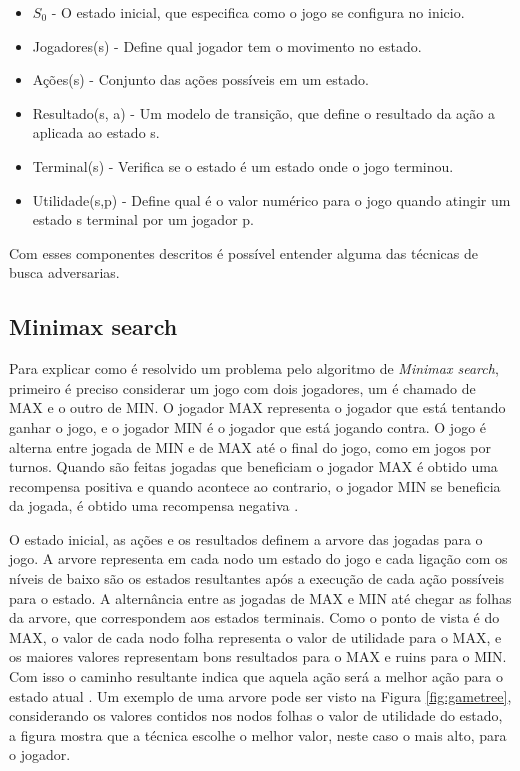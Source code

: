 \begin{itemize}
	\item $S_{0}$ - O estado inicial, que especifica como o jogo se configura no inicio.
	\item Jogadores(s) -  Define qual jogador tem o movimento no estado.
	\item Ações(s) - Conjunto das ações possíveis em um estado.
	\item Resultado(s, a) - Um modelo de transição, que define o resultado da ação a aplicada ao estado s.
	\item Terminal(s) - Verifica se o estado é um estado onde o jogo terminou.
	\item Utilidade(s,p) - Define qual é o valor numérico para o jogo quando atingir um estado s terminal por um jogador p. 
\end{itemize}

Com esses componentes descritos é possível entender alguma das técnicas de busca adversarias. 

\subsection{Minimax search}

Para explicar como é resolvido um problema pelo algoritmo de \textit{Minimax search}, primeiro é preciso considerar um jogo com dois jogadores, um é chamado de MAX e o outro de MIN. O jogador MAX representa o jogador que está tentando ganhar o jogo, e o jogador MIN é o jogador que está jogando contra. O jogo é alterna entre jogada de MIN e de MAX até o final do jogo, como em jogos por turnos. Quando são feitas jogadas que beneficiam o jogador MAX é obtido uma recompensa positiva e quando acontece ao contrario, o jogador MIN se beneficia da jogada, é obtido uma recompensa negativa \cite{intelligence2003modern}.
 
O estado inicial, as ações e os resultados definem a arvore das jogadas para o jogo. A arvore representa em cada nodo um estado do jogo e cada ligação com os níveis de baixo são os estados resultantes após a execução de cada ação possíveis para o estado. A alternância entre as jogadas de MAX e MIN até chegar as folhas da arvore, que correspondem aos estados terminais. Como o ponto de vista é do MAX, o valor de cada nodo folha representa o valor de utilidade para o MAX, e os maiores valores representam bons resultados para o MAX e ruins para o MIN. Com isso o caminho resultante indica que aquela ação será a melhor ação para o estado atual \cite{intelligence2003modern}. Um exemplo de uma arvore pode ser visto na Figura \ref{fig:gametree}, considerando os valores contidos nos nodos folhas o valor de utilidade do estado, a figura mostra que a técnica escolhe o melhor valor, neste caso o mais alto, para o jogador. 

